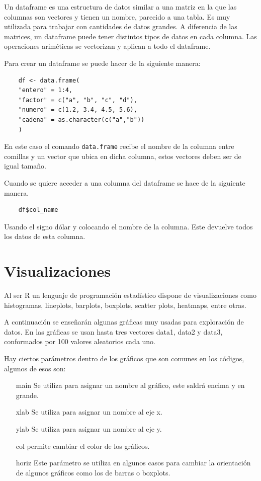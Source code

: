 \documentclass[twoside,twocolumn]{article}
\begin{document}
Un dataframe es una estructura de datos similar a una matriz en la que las columnas son vectores y tienen un nombre, parecido a una tabla. Es muy utilizada para trabajar con cantidades de datos grandes. A diferencia de las matrices, un dataframe puede tener distintos tipos de datos en cada columna. Las operaciones ariméticas se vectorizan y aplican a todo el dataframe.

Para crear un dataframe se puede hacer de la siguiente manera:

\begin{verbatim}
    df <- data.frame(
    "entero" = 1:4, 
    "factor" = c("a", "b", "c", "d"), 
    "numero" = c(1.2, 3.4, 4.5, 5.6),
    "cadena" = as.character(c("a","b"))
    )
\end{verbatim} 

En este caso el comando \verb |data.frame| recibe el nombre de la columna entre comillas y un vector que ubica en dicha columna, estos vectores deben ser de igual tamaño.

Cuando se quiere acceder a una columna del dataframe se hace de la siguiente manera.

\begin{verbatim}
    df$col_name
\end{verbatim}

Usando el signo dólar y colocando el nombre de la columna. Este devuelve todos los datos de esta columna.

\section{Visualizaciones}

Al ser R un lenguaje de programación estadístico dispone de visualizaciones como histogramas, lineplots, barplots, boxplots, scatter plots, heatmaps, entre otras.

A continuación se enseñarán algunas gráficas muy usadas para exploración de datos. En las gráficas se usan hasta tres vectores data1, data2 y data3, conformados por 100 valores aleatorios cada uno.

Hay ciertos parámetros dentro de los gráficos que son comunes en los códigos, algunos de esos son:

\begin{enumerate}
    \item[main] Se utiliza para asignar un nombre al gráfico, este saldrá encima y en grande.
    \item[xlab] Se utiliza para asignar un nombre al eje x.
    \item[ylab] Se utiliza para asignar un nombre al eje y.
    \item[col] permite cambiar el color de los gráficos.
    \item[horiz] Este parámetro se utiliza en algunos casos para cambiar la orientación de algunos gráficos como los de barras o boxplots.
\end{enumerate}
\end{document}
